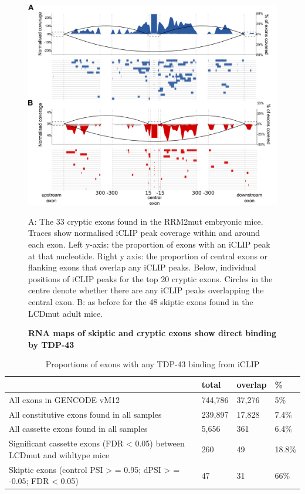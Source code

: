 \begin{figure}[h!]
	\begin{center}
		\includegraphics[width=14cm]{Figures/05_tdp_mice/iclip_multipanel.png}
	\end{center}
	\caption{\textbf{RNA maps of skiptic and cryptic exons show direct binding by TDP-43}}
	A: The 33 cryptic exons found in the RRM2mut embryonic mice. Traces show normalised iCLIP peak coverage within and around each exon. Left y-axis: the proportion of exons with an iCLIP peak at that nucleotide. Right y axis: the proportion of central exons or flanking exons that overlap any iCLIP peaks. Below, individual positions of iCLIP peaks for the top 20 cryptic exons. Circles in the centre denote whether there are any iCLIP peaks overlapping the central exon. B: as before for the 48 skiptic exons found in the LCDmut adult mice.
	\label{iclip_multi}
\end{figure}

\begin{table}
	\begin{footnotesize}
	\begin{tabular}{llll}
		& total &	overlap	& \% \\
		\hline
		All exons in GENCODE vM12 &	744,786	& 37,276 & 5\% \\
		All constitutive exons found in all samples	& 239,897	& 17,828	& 7.4\% \\
		All cassette exons found in all samples &	5,656 &	361	& 6.4\% \\
		Significant cassette exons (FDR < 0.05) between LCDmut and wildtype mice	& 260	& 49 & 18.8\% \\
		Skiptic exons (control PSI > = 0.95; dPSI > = -0.05; FDR < 0.05) & 47 &	31 & 66\% \\
	\end{tabular}
	\end{footnotesize}
	\caption{Proportions of exons with any TDP-43 binding from iCLIP}
	\label{tab:iclip_proportions}
\end{table}

